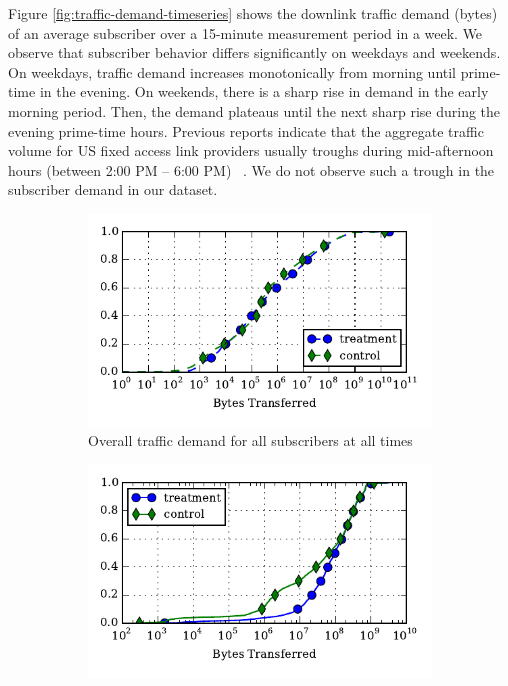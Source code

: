 Figure \ref{fig:traffic-demand-timeseries} shows the downlink traffic demand (bytes)
of an average subscriber over a 15-minute measurement period in a week.
We observe that subscriber behavior differs
significantly on weekdays and weekends. On weekdays, traffic demand 
increases monotonically from morning until prime-time in the evening. On 
weekends, there is a sharp rise in demand in the early morning period. Then, the
demand plateaus until the next sharp rise during the evening prime-time hours.
Previous reports indicate that the aggregate traffic volume for US fixed access
link providers usually troughs during mid-afternoon hours (between 2:00 PM -- 6:00 PM)
~\cite{sandvine20141h}. We do not observe such a trough in the subscriber 
demand in our dataset.

\begin{figure}[t]
\begin{minipage}{1\linewidth}
\centering
%
\begin{subfigure}[b]{.49\linewidth}
\includegraphics[width=\linewidth]{figures/cdf-all-bytes.pdf}
               \caption{Overall traffic demand for all subscribers at all times\label{fig:CDF-data-rate}}
\end{subfigure}
%
\begin{subfigure}[b]{.49\linewidth}
\includegraphics[width=\linewidth]{figures/cdf-per-device-perc95.pdf}

\end{subfigure}
\end{minipage}
\end{figure}
